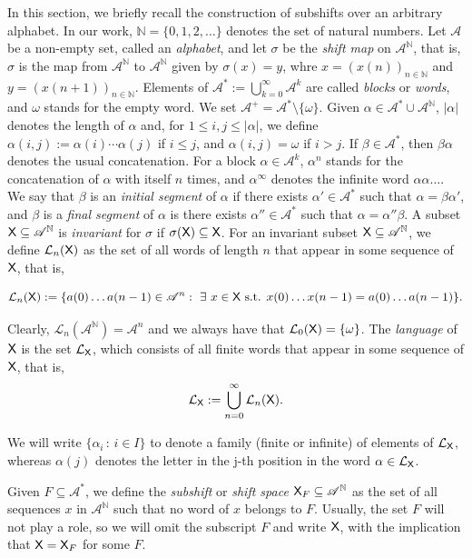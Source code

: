 \documentclass[a4paper,12pt]{amsart}
\theoremstyle{definition}
\theoremstyle{remark}
\numberwithin{equation}{section}
\newcommand{\osf}{{\normalfont \textsf{X}}}
\newcommand{\lang}{\CL_{\osf}}
\newcommand{\alf}{\mathscr{A}}
\newcommand{\N}{\mathbb{N}}
\newcommand{\CL}{\mathcal{L}}
\newcommand{\nn}{\mathbb{N}}
\newcommand{\eword}{\omega}
\begin{document}
In this section, we briefly recall the construction of subshifts over an arbitrary alphabet. In our work, $\nn=\{0,1,2,\ldots\}$ denotes the set of natural numbers. Let $\alf$ be a non-empty set, called an \emph{alphabet}, and let $\sigma$ be the \emph{shift map} on $\alf^\N$, that is, $\sigma$ is the map from $\alf^\N$ to $\alf^\N$ given by $\sigma(x)=y$, whre $x=(x(n))_{n\in \N}$ and  $y=(x(n+1))_{n\in \N}$. Elements of $\alf^*:=\bigcup_{k=0}^\infty \alf^k$ are called \emph{blocks} or \emph{words}, and $\omega$ stands for the empty word. We set $\alf^+=\alf^*\setminus\{\eword\}$. Given $\alpha\in\alf^*\cup\alf^{\N}$, $|\alpha|$ denotes the length of $\alpha$ and, for $1\leq i,j\leq |\alpha|$, we define $\alpha(i,j):=\alpha(i)\cdots\alpha(j)$ if $i\leq j$, and $\alpha(i,j)=\eword$ if $i>j$. If $\beta\in\alf^*$, then $\beta\alpha$ denotes the usual concatenation. For a block $\alpha\in \alf^k$, $\alpha^n$ stands for the concatenation of $\alpha$ with itself $n$ times, and $\alpha^\infty$ denotes the infinite word $\alpha \alpha \ldots$. We say that $\beta$ is an \emph{initial segment} of $\alpha$ if there exists $\alpha'\in \alf^*$ such that $\alpha=\beta \alpha'$, and $\beta$ is a \emph{final segment} of $\alpha$ is there exists $\alpha''\in \alf^*$ such that $\alpha = \alpha'' \beta$. A subset $\osf \subseteq \alf^\N$ is \emph{invariant} for $\sigma$ if $\sigma (\osf)\subseteq \osf$. For an invariant subset $\osf \subseteq \alf^\N$, we define $\CL_n(\osf)$ as the set of all words of length $n$ that appear in some sequence of $\osf$, that is, 

$$\CL_n(\osf):=\{a(0) \ldots a(n-1)\in \alf^n:\ \exists \ x\in \osf \text{ s.t. } x(0)\ldots x(n-1)=a(0)\ldots a(n-1)\}.$$ 

Clearly, $\CL_n(\alf^\N)=\alf^n$ and we always have that $\CL_0(\osf)=\{\omega\}$.
The \emph{language} of $\osf$ is the set $\lang$, which consists of all finite words that appear in some sequence of $\osf$, that is,
$$\lang:=\bigcup_{n=0}^\infty\CL_n(\osf).$$

 We will write $\{\alpha_i\,:\,i\in I\}$ to denote a family (finite or infinite) of elements of $\lang$, whereas $\alpha(j)$ denotes the letter in the j-th position in the word $\alpha\in \lang$. %


\smallskip

Given $F\subseteq \alf^*$, we define the \emph{subshift} or \emph{shift space} $\osf_F\subseteq \alf^\N$ as the set of all sequences $x$ in $\alf^\N$ such that no word of $x$ belongs to $F$. Usually, the set $F$ will not play a role, so we will omit the subscript $F$ and write $\osf$, with the implication that $\osf=\osf_F$ for some $F$. 
\medbreak
\end{document}
